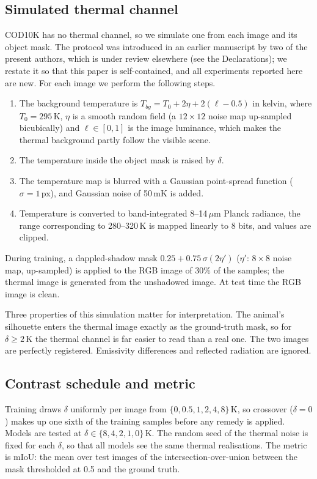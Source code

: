 \documentclass[runningheads]{llncs}
\begin{document}
\subsection{Simulated thermal channel}
COD10K has no thermal channel, so we simulate one from each image and its object mask. The protocol was introduced in an earlier manuscript by two of the present authors, which is under review elsewhere (see the Declarations); we restate it so that this paper is self-contained, and all experiments reported here are new. For each image we perform the following steps.
\begin{enumerate}
\item The background temperature is $T_{bg}=T_0+2\eta+2(\ell-0.5)$ in kelvin, where $T_0=295$\,K, $\eta$ is a smooth random field (a $12\times12$ noise map up-sampled bicubically) and $\ell\in[0,1]$ is the image luminance, which makes the thermal background partly follow the visible scene.
\item The temperature inside the object mask is raised by $\delta$.
\item The temperature map is blurred with a Gaussian point-spread function ($\sigma=1$\,px), and Gaussian noise of 50\,mK is added.
\item Temperature is converted to band-integrated 8--14\,$\mu$m Planck radiance, the range corresponding to 280--320\,K is mapped linearly to 8 bits, and values are clipped.
\end{enumerate}
During training, a dappled-shadow mask $0.25+0.75\,\sigma(2\eta')$ ($\eta'$: $8\times8$ noise map, up-sampled) is applied to the RGB image of 30\% of the samples; the thermal image is generated from the unshadowed image. At test time the RGB image is clean.

Three properties of this simulation matter for interpretation. The animal's silhouette enters the thermal image exactly as the ground-truth mask, so for $\delta\geq2$\,K the thermal channel is far easier to read than a real one. The two images are perfectly registered. Emissivity differences and reflected radiation are ignored.

\subsection{Contrast schedule and metric}
Training draws $\delta$ uniformly per image from $\{0,0.5,1,2,4,8\}$\,K, so crossover ($\delta=0$) makes up one sixth of the training samples before any remedy is applied. Models are tested at $\delta\in\{8,4,2,1,0\}$\,K. The random seed of the thermal noise is fixed for each $\delta$, so that all models see the same thermal realisations. The metric is mIoU: the mean over test images of the intersection-over-union between the mask thresholded at 0.5 and the ground truth.
\end{document}
